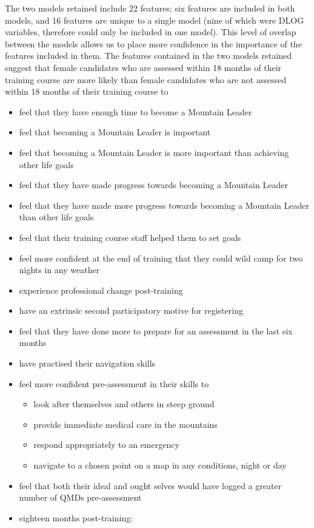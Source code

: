 \documentclass[
  12pt,
  a4paper,
]{book}
\providecommand{\tightlist}{%
  \setlength{\itemsep}{0pt}\setlength{\parskip}{0pt}}
\begin{document}
The two models retained include 22 features; six features are included in both models, and 16 features are unique to a single model (nine of which were DLOG variables, therefore could only be included in one model). This level of overlap between the models allows us to place more confidence in the importance of the features included in them. The features contained in the two models retained suggest that female candidates who are assessed within 18 months of their training course are more likely than female candidates who are not assessed within 18 months of their training course to

\begin{itemize}
\tightlist
\item
  feel that they have enough time to become a Mountain Leader
\item
  feel that becoming a Mountain Leader is important
\item
  feel that becoming a Mountain Leader is more important than achieving other life goals
\item
  feel that they have made progress towards becoming a Mountain Leader
\item
  feel that they have made more progress towards becoming a Mountain Leader than other life goals
\item
  feel that their training course staff helped them to set goals
\item
  feel more confident at the end of training that they could wild camp for two nights in any weather
\item
  experience professional change post-training
\item
  have an extrinsic second participatory motive for registering
\item
  feel that they have done more to prepare for an assessment in the last six months
\item
  have practised their navigation skills
\item
  feel more confident pre-assessment in their skills to

  \begin{itemize}
  \tightlist
  \item
    look after themselves and others in steep ground
  \item
    provide immediate medical care in the mountains
  \item
    respond appropriately to an emergency
  \item
    navigate to a chosen point on a map in any conditions, night or day
  \end{itemize}
\item
  feel that both their ideal and ought selves would have logged a greater number of QMDs pre-assessment
\item
  eighteen months post-training:


\end{itemize}
\end{document}
